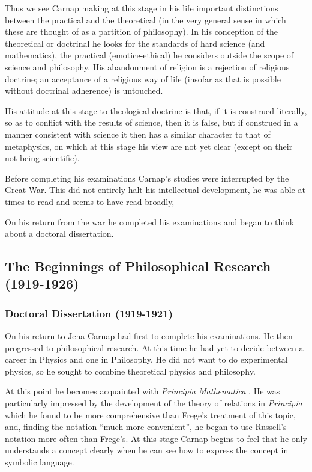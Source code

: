 \documentclass[10pt,titlepage]{book}
\begin{document}
Thus we see Carnap making at this stage in his life important distinctions between the practical and the theoretical (in the very general sense in which these are thought of as a partition of philosophy).
In his conception of the theoretical or doctrinal he looks for the standards of hard science (and mathematics), the practical (emotice-ethical) he considers outside the scope of science and philosophy.
His abandonment of religion is a rejection of religious doctrine; an acceptance of a religious way of life (insofar as that is possible without doctrinal adherence) is untouched.

His attitude at this stage to theological doctrine is that, if it is construed literally, so as to conflict with the results of science, then it is false, but if construed in a manner consistent with science it then has a similar character to that of metaphysics, on which at this stage his view are not yet clear (except on their not being scientific).

Before completing his examinations Carnap's studies were interrupted by the Great War.
This did not entirely halt his intellectual development, he was able at times to read and seems to have read broadly,

On his return from the war he completed his examinations and began to think about a doctoral dissertation.

\subsection{The Beginnings of Philosophical Research (1919-1926)}

\subsubsection{Doctoral Dissertation (1919-1921)}

On his return to Jena Carnap had first to complete his examinations.
He then progressed to philosophical research.
At this time he had yet to decide between a career in Physics and one in Philosophy.
He did not want to do experimental physics, so he sought to combine theoretical physics and philosophy.

At this point he becomes acquainted with \emph{Principia Mathematica} \cite{russell10}.
He was particularly impressed by the development of the theory of relations in \emph{Principia} which he found to be more comprehensive than Frege's treatment of this topic, and, finding the notation ``much more convenient'', he began to use Russell's notation more often than Frege's.
At this stage Carnap begins to feel that he only understands a concept clearly when he can see how to express the concept in symbolic language.
\end{document}
